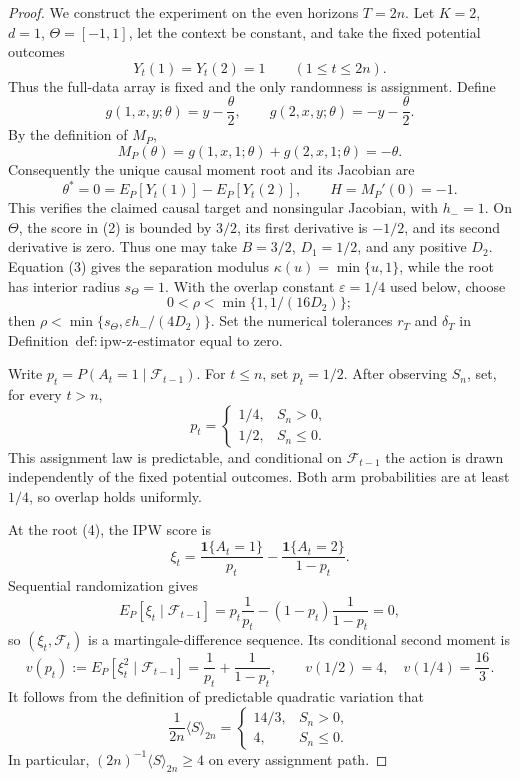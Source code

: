 \documentclass{article}
\begin{document}
\begin{proof}
We construct the experiment on the even horizons \(T=2n\).  Let \(K=2\), \(d=1\), \(\Theta=[-1,1]\), let the context be constant, and take the fixed potential outcomes
\[
Y_t(1)=Y_t(2)=1\qquad(1\le t\le 2n).
\tag{1}
\]
Thus the full-data array is fixed and the only randomness is assignment.  Define
\[
g(1,x,y;\theta)=y-\frac{\theta}{2},
\qquad
g(2,x,y;\theta)=-y-\frac{\theta}{2}.
\tag{2}
\]
By the definition of \(M_P\),
\[
M_P(\theta)=g(1,x,1;\theta)+g(2,x,1;\theta)=-\theta.
\tag{3}
\]
Consequently the unique causal moment root and its Jacobian are
\[
\theta^*=0=E_P[Y_t(1)]-E_P[Y_t(2)],
\qquad H=M_P'(0)=-1.
\tag{4}
\]
This verifies the claimed causal target and nonsingular Jacobian, with \(h_-=1\).  On \(\Theta\), the score in (2) is bounded by \(3/2\), its first derivative is \(-1/2\), and its second derivative is zero.  Thus one may take \(B=3/2\), \(D_1=1/2\), and any positive \(D_2\).  Equation (3) gives the separation modulus \(\kappa(u)=\min\{u,1\}\), while the root has interior radius \(s_\Theta=1\).  With the overlap constant \(\varepsilon=1/4\) used below, choose
\[
0<\rho<\min\{1,1/(16D_2)\};
\tag{5}
\]
then \(\rho<\min\{s_\Theta,\varepsilon h_-/(4D_2)\}\).  Set the numerical tolerances \(r_T\) and \(\delta_T\) in Definition~\(\mathrm{def:ipw\text{-}z\text{-}estimator}\) equal to zero.

Write \(p_t=P(A_t=1\mid\mathcal F_{t-1})\).  For \(t\le n\), set \(p_t=1/2\).  After observing \(S_n\), set, for every \(t>n\),
\[
p_t=
\begin{cases}
1/4,&S_n>0,\\
1/2,&S_n\le0.
\end{cases}
\tag{6}
\]
This assignment law is predictable, and conditional on \(\mathcal F_{t-1}\) the action is drawn independently of the fixed potential outcomes.  Both arm probabilities are at least \(1/4\), so overlap holds uniformly.

At the root (4), the IPW score is
\[
\xi_t=
\frac{\mathbf1\{A_t=1\}}{p_t}
-\frac{\mathbf1\{A_t=2\}}{1-p_t}.
\tag{7}
\]
Sequential randomization gives
\[
E_P[\xi_t\mid\mathcal F_{t-1}]
=p_t\frac1{p_t}-(1-p_t)\frac1{1-p_t}=0,
\tag{8}
\]
so \((\xi_t,\mathcal F_t)\) is a martingale-difference sequence.  Its conditional second moment is
\[
v(p_t):=E_P[\xi_t^2\mid\mathcal F_{t-1}]
=\frac1{p_t}+\frac1{1-p_t},
\qquad
v(1/2)=4,
\quad v(1/4)=\frac{16}{3}.
\tag{9}
\]
It follows from the definition of predictable quadratic variation that
\[
\frac1{2n}\langle S\rangle_{2n}
=
\begin{cases}
14/3,&S_n>0,\\
4,&S_n\le0.
\end{cases}
\tag{10}
\]
In particular, \((2n)^{-1}\langle S\rangle_{2n}\ge4\) on every assignment path.


\end{proof}
\end{document}
